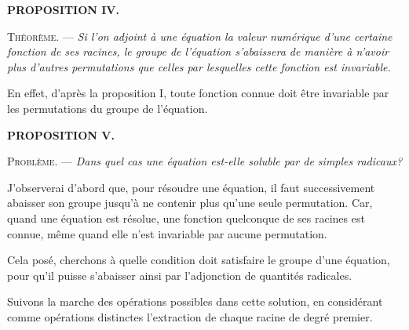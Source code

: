 

\begin{center}{\bfseries PROPOSITION IV.}\end{center}

\noindent\textsc{Théorème.} --- \emph{Si l'on adjoint à une équation la valeur numérique
d'une certaine fonction de ses racines, le groupe de
l'équation s'abaissera de manière à n'avoir plus d'autres
permutations que celles par lesquelles cette fonction est invariable.}

En effet, d'après la proposition I, toute fonction connue doit
être invariable par les permutations du groupe de l'équation.

\begin{center}{\bfseries PROPOSITION V.}\end{center}

\noindent\textsc{Problème.} --- \emph{Dans quel cas une équation est-elle soluble par
de simples radicaux?}

J'observerai d'abord que, pour résoudre une équation, il faut
successivement abaisser son groupe jusqu'à ne contenir plus
qu'une seule permutation. Car, quand une équation est résolue,
une fonction quelconque de ses racines est connue, même quand
elle n'est invariable par aucune permutation.

Cela posé, cherchons à quelle condition doit satisfaire le groupe
d'une équation, pour qu'il puisse s'abaisser ainsi par l'adjonction
de quantités radicales.

Suivons la marche des opérations possibles dans cette solution,
en considérant comme opérations distinctes l'extraction de chaque
racine de degré premier.
